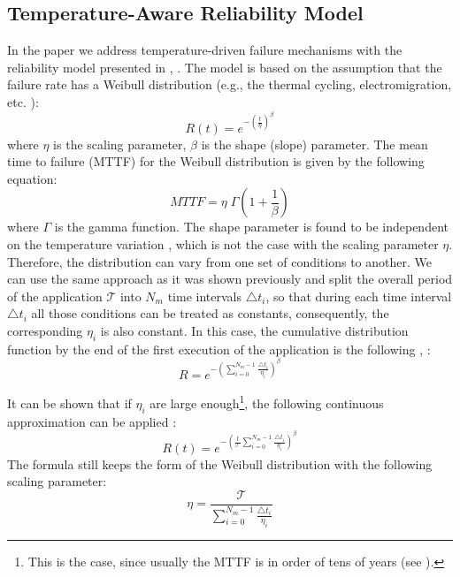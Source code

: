 \subsection{Temperature-Aware Reliability Model}
In the paper we address temperature-driven failure mechanisms with the reliability model presented in \cite{huang2009}, \cite{xiang2010}. The model is based on the assumption that the failure rate has a Weibull distribution (e.g., the thermal cycling, electromigration, etc. \cite{jedec2010}):
\[
  R(t) = e^{-(\frac{t}{\eta})^\beta}
\]
where $\eta$ is the scaling parameter, $\beta$ is the shape (slope) parameter. The mean time to failure (MTTF) for the Weibull distribution is given by the following equation:
\begin{equation} \label{eq:general-mttf}
  MTTF = \eta \; \Gamma(1 + \frac{1}{\beta})
\end{equation}
where $\Gamma$ is the gamma function. The shape parameter is found to be independent on the temperature variation \cite{chang2006}, which is not the case with the scaling parameter $\eta$. Therefore, the distribution can vary from one set of conditions to another. We can use the same approach as it was shown previously and split the overall period of the application $\mathcal{T}$ into $N_m$ time intervals $\triangle t_i$, so that during each time interval $\triangle t_i$ all those conditions can be treated as constants, consequently, the corresponding $\eta_i$ is also constant. In this case, the cumulative distribution function by the end of the first execution of the application is the following \cite{huang2009}, \cite{xiang2010}:
\[
  R = e^{-(\sum_{i=0}^{N_m - 1} \frac{\triangle t_i}{\eta_i})^\beta}
\]

It can be shown that if $\eta_i$ are large enough\footnote{This is the case, since usually the MTTF is in order of tens of years (see ).}, the following continuous approximation can be applied \cite{xiang2010}:
\[
  R(t) = e^{-(\frac{t}{\mathcal{T}} \sum_{i=0}^{N_m - 1} \frac{\triangle t_i}{\eta_i})^\beta}
\]
The formula still keeps the form of the Weibull distribution with the following scaling parameter:
\[
  \eta = \frac{\mathcal{T}}{\sum_{i=0}^{N_m - 1} \frac{\triangle t_i}{\eta_i}}
\]

